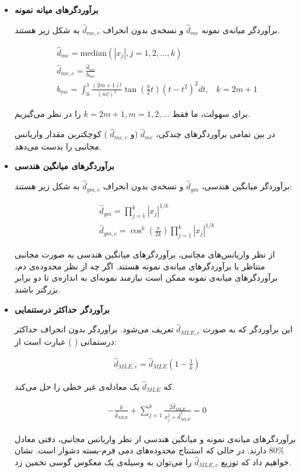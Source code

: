 \begin{itemize}
\item
\textbf{
برآوردگرهای میانه نمونه
}

برآوردگر‌ میانه‌ی نمونه 
$\hat{d}_{me}$
و نسخه‌ی بدون انحراف 
$\hat{d}_{me,c}$
به شکل زیر هستند.

\begin{align}
\hat{d}_{me} = \mathrm{median} \left( \left| x_j \right|, j=1,2, \ldots, k \right)\\
\hat{d}_{me,c} = \frac{\hat{d}_{me}}{b_{me}}\\
b_{me} = \int_0^1 \frac{(2m+1)!}{(m!)^2} \tan \left( \frac{\pi}{2} t \right) \left( t - t^2 \right)^2 dt, \;\;\; k = 2m+1
\label{eq:1iT}
\end{align}

برای سهولت، ما فقط 
$k = 2m+1, m = 1,2, \ldots$
را در نظر می‌گیریم.

در بین تمامی برآوردگرهای چندکی، 
$\hat{d}_{me}$
(و 
$\hat{d}_{me,c}$
) کوچکترین مقدار واریانس مجانبی را بدست می‌دهد.

\item
\textbf{
برآوردگرهای میانگین هندسی
}

برآوردگر میانگین هندسی، 
$\hat{d}_{gm}$
و نسخه‌ی بدون انحراف 
$\hat{d}_{gm,c}$
به شکل زیر هستند:

\begin{align}
\hat{d}_{gm} = \prod_{j=1}^k \left| x_j \right|^{1/k}\\
\hat{d}_{gm,c} = \cos^k \left( \frac{\pi}{2k} \right) \prod_{j=1}^k \left| x_j \right|^{1/k}
\label{eq:1iU.0}
\end{align}

از نظر واریانس‌های مجانبی، برآوردگرهای میانگین هندسی به صورت مجانبی متناظر با برآوردگرهای میانه‌ی نمونه هستند. اگر چه از نظر محدوده‌ی دم، برآوردگرهای میانه‌ی نمونه ممکن است نیازمند نمونه‌ای به اندازه‌ی تا دو برابر بزرگتر باشند.

\item
\textbf{
برآوردگر حداکثر درستنمایی
}

این برآوردگر که به صورت 
$\hat{d}_{MLE,c}$
تعریف می‌شود. برآوردگر بدون انحراف حداکثر درستمانی (
) عبارت است از:

\begin{align}
\hat{d}_{MLE,c} = \hat{d}_{MLE} \left( 1 - \frac{1}{k} \right)
\label{eq:1iU.1}
\end{align}

که 
$\hat{d}_{MLE}$
یک معادله‌ی غیر خطی 
را حل می‌کند.

\begin{align}
- \frac{k}{\hat{d}_{MLE}} + \sum_{j=1}^k \frac{2\hat{d}_{MLE}}{x_j^2 + \hat{d}_{MLE}^2 } = 0
\label{eq:1iV}
\end{align}

برآوردگرهای میانه‌ی نمونه و میانگین هندسی از نظر واریانس مجانبی، دقتی معادل 
$80\%$
دارند. در حالی که استنتاج محدوده‌های دمی فرم-بسته دشوار است. نشان‌ خواهیم داد که توزیع 
$\hat{d}_{MLE,c}$
را می‌توان به وسیله‌ی یک معکوس گوسی%
تخمین زد.

\end{itemize}



